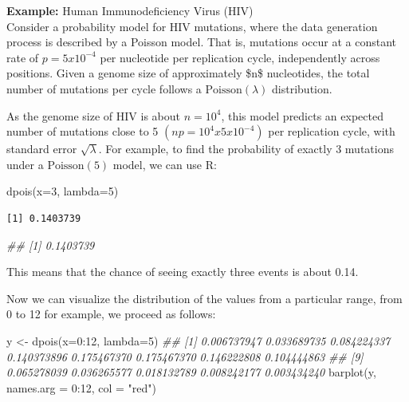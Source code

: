 \documentclass[
  letterpaper,
  DIV=11,
  numbers=noendperiod]{scrreprt}
\newenvironment{Shaded}{\begin{snugshade}}{\end{snugshade}}
\newcommand{\AttributeTok}[1]{\textcolor[rgb]{0.40,0.45,0.13}{#1}}
\newcommand{\DecValTok}[1]{\textcolor[rgb]{0.68,0.00,0.00}{#1}}
\newcommand{\DocumentationTok}[1]{\textcolor[rgb]{0.37,0.37,0.37}{\textit{#1}}}
\newcommand{\FunctionTok}[1]{\textcolor[rgb]{0.28,0.35,0.67}{#1}}
\newcommand{\NormalTok}[1]{\textcolor[rgb]{0.00,0.23,0.31}{#1}}
\newcommand{\OtherTok}[1]{\textcolor[rgb]{0.00,0.23,0.31}{#1}}
\newcommand{\SpecialCharTok}[1]{\textcolor[rgb]{0.37,0.37,0.37}{#1}}
\newcommand{\StringTok}[1]{\textcolor[rgb]{0.13,0.47,0.30}{#1}}
\begin{document}
\begin{tcolorbox}[enhanced jigsaw, arc=.35mm, bottomrule=.15mm, bottomtitle=1mm, breakable, colback=white, colbacktitle=quarto-callout-note-color!10!white, colframe=quarto-callout-note-color-frame, coltitle=black, left=2mm, leftrule=.75mm, opacityback=0, opacitybacktitle=0.6, rightrule=.15mm, title={Note}, titlerule=0mm, toprule=.15mm, toptitle=1mm]

\textbf{Example:} Human Immunodeficiency Virus (HIV)\\
Consider a probability model for HIV mutations, where the data
generation process is described by a Poisson model. That is, mutations
occur at a constant rate of \(p=5 x 10^{-4}\) per nucleotide per
replication cycle, independently across positions. Given a genome size
of approximately \$n\$ nucleotides, the total number of mutations per
cycle follows a \(\text{Poisson}(\lambda)\) distribution.

As the genome size of HIV is about \(n=10^4\), this model predicts an
expected number of mutations close to 5 \((np=10^4 x 5 x 10^{-4})\) per
replication cycle, with standard error \(\sqrt{\lambda}\). For example,
to find the probability of exactly 3 mutations under a
\(\text{Poisson}(5)\) model, we can use R:

\begin{Shaded}
\begin{Highlighting}[]
\FunctionTok{dpois}\NormalTok{(}\AttributeTok{x=}\DecValTok{3}\NormalTok{, }\AttributeTok{lambda=}\DecValTok{5}\NormalTok{)}
\end{Highlighting}
\end{Shaded}

\begin{verbatim}
[1] 0.1403739
\end{verbatim}

\begin{Shaded}
\begin{Highlighting}[]
\DocumentationTok{\#\# [1] 0.1403739}
\end{Highlighting}
\end{Shaded}

This means that the chance of seeing exactly three events is about 0.14.

Now we can visualize the distribution of the values from a particular
range, from 0 to 12 for example, we proceed as follows:

\begin{Shaded}
\begin{Highlighting}[]
\NormalTok{y }\OtherTok{\textless{}{-}} \FunctionTok{dpois}\NormalTok{(}\AttributeTok{x=}\DecValTok{0}\SpecialCharTok{:}\DecValTok{12}\NormalTok{, }\AttributeTok{lambda=}\DecValTok{5}\NormalTok{)}
\DocumentationTok{\#\# [1] 0.006737947 0.033689735 0.084224337 0.140373896 0.175467370 0.175467370 0.146222808 0.104444863}
\DocumentationTok{\#\# [9] 0.065278039 0.036265577 0.018132789 0.008242177 0.003434240}
\FunctionTok{barplot}\NormalTok{(y, }\AttributeTok{names.arg =} \DecValTok{0}\SpecialCharTok{:}\DecValTok{12}\NormalTok{, }\AttributeTok{col =} \StringTok{"red"}\NormalTok{)}
\end{Highlighting}
\end{Shaded}


\end{tcolorbox}
\end{document}
